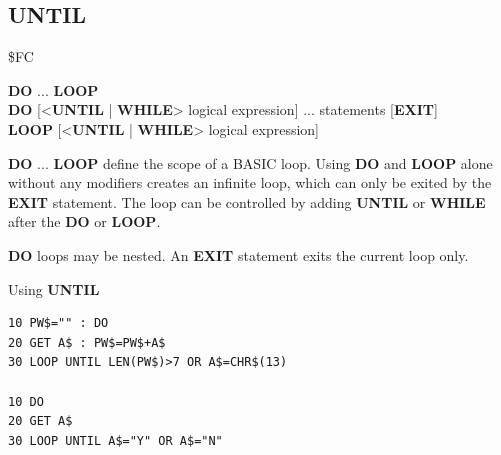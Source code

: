 \subsection{UNTIL}
\begin{description}[leftmargin=2cm,style=nextline]
\item [Token:]    \$FC

\item [Format:]   {\bf DO} ... {\bf LOOP} \\
                  {\bf DO} [<{\bf UNTIL} | {\bf WHILE}> logical expression] ... statements [{\bf EXIT}] \\
                  {\bf LOOP} [<{\bf UNTIL} | {\bf WHILE}> logical expression]

\item [Usage:]    {\bf DO} ... {\bf LOOP} define the scope of a BASIC loop. Using {\bf DO} and {\bf LOOP} alone without any modifiers creates an infinite loop, which can only be exited by the {\bf EXIT} statement. The loop can be controlled by adding {\bf UNTIL} or {\bf WHILE} after the {\bf DO} or {\bf LOOP}.

\item [Remarks:]  {\bf DO} loops may be nested. An {\bf EXIT} statement exits the current loop only.

\item [Examples:] Using {\bf UNTIL}

\begin{tcolorbox}[colback=black,coltext=white]
\verbatimfont{\codefont}
\begin{verbatim}
10 PW$="" : DO
20 GET A$ : PW$=PW$+A$
30 LOOP UNTIL LEN(PW$)>7 OR A$=CHR$(13)

10 DO
20 GET A$
30 LOOP UNTIL A$="Y" OR A$="N"
\end{verbatim}
\end{tcolorbox}
\end{description}


\newpage

